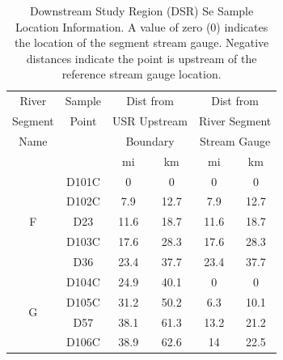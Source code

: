 \begin{linenumbers}
\begin{table}[htbp]
	\centering
	\caption[Downstream Study Region (DSR) Se Sample Location Information.]{Downstream Study Region (DSR) Se Sample Location Information.  A value of zero (0) indicates the location of the segment stream gauge.  Negative distances indicate the point is upstream of the reference stream gauge location.}
	\label{tab:DSRSampleLoc}
	\begin{tabular}{cccccc}
		\toprule
		River                        & Sample &  \multicolumn{2}{c}{Dist from}   &   \multicolumn{2}{c}{Dist from}   \\
		Segment                       & Point  & \multicolumn{2}{c}{USR Upstream} & \multicolumn{2}{c}{River Segment} \\
		Name                         &        &   \multicolumn{2}{c}{Boundary}   & \multicolumn{2}{c}{Stream Gauge}  \\
		\cmidrule(r{0.5em}l){3-4} \cmidrule(r{0.5em}l){5-6} &        &  mi  &            km             &  mi  &             km             \\ \toprule
		\multirow{5}{*}{F}                  & D101C  &  0   &             0             &  0   &             0              \\
		& D102C  & 7.9  &           12.7            & 7.9  &            12.7            \\
		&  D23   & 11.6 &           18.7            & 11.6 &            18.7            \\
		& D103C  & 17.6 &           28.3            & 17.6 &            28.3            \\
		&  D36   & 23.4 &           37.7            & 23.4 &            37.7            \\ \midrule
		\multirow{4}{*}{G}                  & D104C  & 24.9 &           40.1            &  0   &             0              \\
		& D105C  & 31.2 &           50.2            & 6.3  &            10.1            \\
		&  D57   & 38.1 &           61.3            & 13.2 &            21.2            \\
		& D106C  & 38.9 &           62.6            &  14  &            22.5            \\ \bottomrule
	\end{tabular}
\end{table}


\end{linenumbers}

